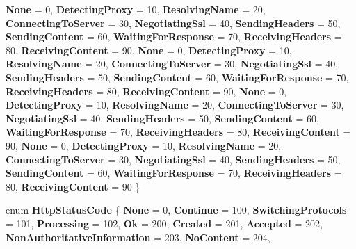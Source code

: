 \begin{DoxyCompactItemize}
{\bfseries None} = 0, 
{\bfseries Detecting\+Proxy} = 10, 
\newline
{\bfseries Resolving\+Name} = 20, 
{\bfseries Connecting\+To\+Server} = 30, 
{\bfseries Negotiating\+Ssl} = 40, 
{\bfseries Sending\+Headers} = 50, 
\newline
{\bfseries Sending\+Content} = 60, 
{\bfseries Waiting\+For\+Response} = 70, 
{\bfseries Receiving\+Headers} = 80, 
{\bfseries Receiving\+Content} = 90, 
\newline
{\bfseries None} = 0, 
{\bfseries Detecting\+Proxy} = 10, 
{\bfseries Resolving\+Name} = 20, 
{\bfseries Connecting\+To\+Server} = 30, 
\newline
{\bfseries Negotiating\+Ssl} = 40, 
{\bfseries Sending\+Headers} = 50, 
{\bfseries Sending\+Content} = 60, 
{\bfseries Waiting\+For\+Response} = 70, 
\newline
{\bfseries Receiving\+Headers} = 80, 
{\bfseries Receiving\+Content} = 90, 
{\bfseries None} = 0, 
{\bfseries Detecting\+Proxy} = 10, 
\newline
{\bfseries Resolving\+Name} = 20, 
{\bfseries Connecting\+To\+Server} = 30, 
{\bfseries Negotiating\+Ssl} = 40, 
{\bfseries Sending\+Headers} = 50, 
\newline
{\bfseries Sending\+Content} = 60, 
{\bfseries Waiting\+For\+Response} = 70, 
{\bfseries Receiving\+Headers} = 80, 
{\bfseries Receiving\+Content} = 90, 
\newline
{\bfseries None} = 0, 
{\bfseries Detecting\+Proxy} = 10, 
{\bfseries Resolving\+Name} = 20, 
{\bfseries Connecting\+To\+Server} = 30, 
\newline
{\bfseries Negotiating\+Ssl} = 40, 
{\bfseries Sending\+Headers} = 50, 
{\bfseries Sending\+Content} = 60, 
{\bfseries Waiting\+For\+Response} = 70, 
\newline
{\bfseries Receiving\+Headers} = 80, 
{\bfseries Receiving\+Content} = 90
 \}
\item 
\mbox{\label{namespace_windows_1_1_web_1_1_http_a2378c3ed9d3b208a45e8b6dcc91ea4e4}} 
enum {\bfseries Http\+Status\+Code} \{ \newline
{\bfseries None} = 0, 
{\bfseries Continue} = 100, 
{\bfseries Switching\+Protocols} = 101, 
{\bfseries Processing} = 102, 
\newline
{\bfseries Ok} = 200, 
{\bfseries Created} = 201, 
{\bfseries Accepted} = 202, 
{\bfseries Non\+Authoritative\+Information} = 203, 
\newline
{\bfseries No\+Content} = 204, 

\end{DoxyCompactItemize}
